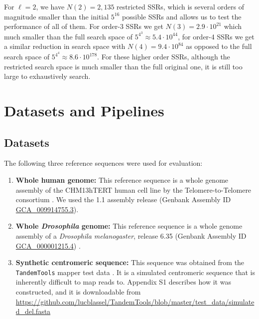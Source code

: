 \documentclass[
  11pt,
  twoside]{scrbook}
\begin{document}
For \(\ell=2\), we have \(N(2)=2,135\) restricted SSRs, which is several orders of magnitude smaller than the initial \(5^{16}\) possible SSRs and allows us to test the performance of all of them. For order-3 SSRs we get \(N(3)=2.9\cdot10^{21}\) which much smaller than the full search space of \(5^{4^3}\approx5.4\cdot10^{44}\), for order-4 SSRs we get a similar reduction in search space with \(N(4)=9.4\cdot10^{84}\) as opposed to the full search space of \(5^{4^4}\approx8.6\cdot10^{178}\). For these higher order SSRs, although the restricted search space is much smaller than the full original one, it is still too large to exhaustively search.

\hypertarget{datasets-and-pipelines}{%
\section{Datasets and Pipelines}\label{datasets-and-pipelines}}

\hypertarget{datasets}{%
\subsection{Datasets}\label{datasets}}

The following three reference sequences were used for evaluation:

\begin{enumerate}
\def\labelenumi{\arabic{enumi}.}
\item
  \textbf{Whole human genome:} This reference sequence is a whole genome assembly of the CHM13hTERT human cell line by the Telomere-to-Telomere consortium \autocite{nurk2022}. We used the 1.1 assembly release (Genbank Assembly ID \href{https://www.ncbi.nlm.nih.gov/assembly/GCA_009914755.3/}{GCA\_009914755.3}).
\item
  \textbf{Whole \emph{Drosophila} genome:} This reference sequence is a whole genome assembly of a \emph{Drosophila melanogaster}, release 6.35 (Genbank Assembly ID \href{https://www.ncbi.nlm.nih.gov/assembly/GCF_000001215.4/}{GCA\_000001215.4}) \autocite{adamsGenomeSequenceDrosophila2000}.
\item
  \textbf{Synthetic centromeric sequence:} This sequence was obtained from the \texttt{TandemTools} mapper test data \autocite{mikheenkoTandemToolsMappingLong2020}. It is a simulated centromeric sequence that is inherently difficult to map reads to. Appendix S1 describes how it was constructed, and it is downloadable from \url{https://github.com/lucblassel/TandemTools/blob/master/test_data/simulated_del.fasta}
\end{enumerate}
\end{document}
